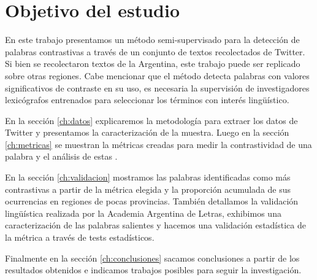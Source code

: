 
\section{Objetivo del estudio}

En este trabajo presentamos un método semi-supervisado para la detección de palabras contrastivas a través de un conjunto de textos recolectados de Twitter. Si bien se recolectaron textos de la Argentina, este trabajo puede ser replicado sobre otras regiones. Cabe mencionar que el método detecta palabras con valores significativos de contraste en su uso, es necesaria la supervisión de investigadores lexicógrafos entrenados para seleccionar los términos con interés lingüístico.

En la sección \ref{ch:datos} explicaremos la metodología para extraer los datos de Twitter y presentamos la caracterización de la muestra. 
Luego en la sección \ref{ch:metricas} se muestran la métricas creadas para medir la contrastividad de una palabra y el análisis de estas .

En la sección \ref{ch:validacion} mostramos las palabras identificadas como más contrastivas a partir de la métrica elegida y la proporción acumulada de sus ocurrencias en regiones de pocas provincias. 
También detallamos la validación lingüística realizada por la Academia Argentina de Letras, exhibimos una caracterización de las palabras salientes y hacemos una validación estadística de la métrica a través de tests estadísticos. 

Finalmente en la sección \ref{ch:conclusiones} sacamos conclusiones a partir de los resultados obtenidos e indicamos trabajos posibles para seguir la investigación.


